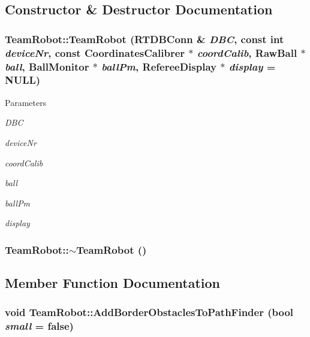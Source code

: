 \subsection{Constructor \& Destructor Documentation}
\hypertarget{classTeamRobot_a4b116f58f0a1568a886d03b0c71df20c}{
\subsubsection[{TeamRobot}]{\setlength{\rightskip}{0pt plus 5cm}TeamRobot::TeamRobot (RTDBConn \& {\em DBC}, \/  const int {\em deviceNr}, \/  const {\bf CoordinatesCalibrer} $\ast$ {\em coordCalib}, \/  RawBall $\ast$ {\em ball}, \/  {\bf BallMonitor} $\ast$ {\em ballPm}, \/  {\bf RefereeDisplay} $\ast$ {\em display} = {\ttfamily NULL})}}
\label{classTeamRobot_a4b116f58f0a1568a886d03b0c71df20c}

\begin{DoxyParams}{Parameters}
\item[{\em DBC}]\item[{\em deviceNr}]\item[{\em coordCalib}]\item[{\em ball}]\item[{\em ballPm}]\item[{\em display}]\end{DoxyParams}
\hypertarget{classTeamRobot_a7be9d5161b7524cbbb6ae486ad4a1b42}{
\subsubsection[{$\sim$TeamRobot}]{\setlength{\rightskip}{0pt plus 5cm}TeamRobot::$\sim$TeamRobot ()}}
\label{classTeamRobot_a7be9d5161b7524cbbb6ae486ad4a1b42}


\subsection{Member Function Documentation}
\hypertarget{classTeamRobot_acf4c435c98bc406744a12cd140d6631d}{
\subsubsection[{AddBorderObstaclesToPathFinder}]{\setlength{\rightskip}{0pt plus 5cm}void TeamRobot::AddBorderObstaclesToPathFinder (bool {\em small} = {\ttfamily false})}}
\label{classTeamRobot_acf4c435c98bc406744a12cd140d6631d}

